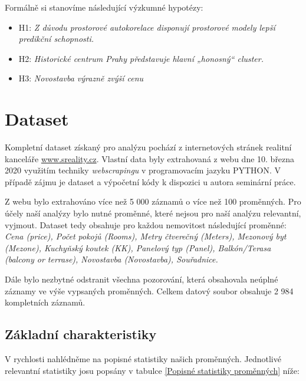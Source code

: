 \documentclass[11pt, a4paper]{article}
\begin{document}
Formálně si stanovíme následující výzkumné hypotézy:
  
  \begin{itemize}
\item H{1}: \textit{Z důvodu prostorové autokorelace disponují prostorové modely lepší predikční schopnosti.}

\item H{2}: \textit{Historické centrum Prahy představuje hlavní „honosný“ cluster.}

\item H{3}: \textit{Novostavba výrazně zvýší cenu}
\end{itemize}

\section{Dataset}

Kompletní dataset získaný pro analýzu pochází z internetových stránek realitní kanceláře \url{www.sreality.cz}. Vlastní data byly extrahovaná z webu dne 10. března 2020 využitím techniky \textit{webscrapingu} v programovacím jazyku PYTHON. V případě zájmu je dataset a výpočetní kódy k dispozici u autora seminární práce. 

Z webu bylo extrahováno více než 5 000 záznamů o více než 100 proměnných. Pro účely naší analýzy bylo nutné proměnné, které nejsou pro naší analýzu relevantní, vyjmout. Dataset tedy obsahuje pro každou nemovitost následující proměnné: \textit{Cena (price), Počet pokojů (Rooms), Metry čtverečný (Meters), Mezonový byt (Mezone), Kuchyňský koutek (KK), Panelový typ (Panel), Balkón/Terasa (balcony or terrase), Novostavba (Novostavba), Souřadnice.} 

Dále bylo nezbytné odstranit všechna pozorování, která obsahovala neúplné záznamy ve výše vypsaných proměnných. Celkem datový soubor obsahuje 2 984 kompletních záznamů.

\subsection{Základní charakteristiky}

V rychlosti nahlédněme na popisné statistiky našich proměnných. Jednotlivé relevantní statistiky josu popsány v tabulce \ref{Popisné statistiky proměnných} níže:
  
\end{document}
